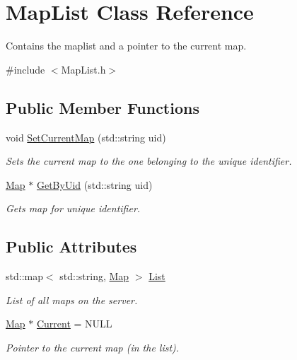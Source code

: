 \hypertarget{classMapList}{\section{Map\-List Class Reference}
\label{classMapList}
}


Contains the maplist and a pointer to the current map.  




{\ttfamily \#include $<$Map\-List.\-h$>$}

\subsection*{Public Member Functions}
\begin{DoxyCompactItemize}
\item 
void \hyperlink{classMapList_a8202d99b60adc444fb42f0ce2d2b3dbd}{Set\-Current\-Map} (std\-::string uid)
\begin{DoxyCompactList}\small\item\em Sets the current map to the one belonging to the unique identifier. \end{DoxyCompactList}\item 
\hyperlink{structMap}{Map} $\ast$ \hyperlink{classMapList_ada7a7c8b0a9b7e1ba41d0678b86d4b61}{Get\-By\-Uid} (std\-::string uid)
\begin{DoxyCompactList}\small\item\em Gets map for unique identifier. \end{DoxyCompactList}\end{DoxyCompactItemize}
\subsection*{Public Attributes}
\begin{DoxyCompactItemize}
\item 
\hypertarget{classMapList_a02d028e30cdaf96170b885237b34990c}{std\-::map$<$ std\-::string, \hyperlink{structMap}{Map} $>$ \hyperlink{classMapList_a02d028e30cdaf96170b885237b34990c}{List}}\label{classMapList_a02d028e30cdaf96170b885237b34990c}

\begin{DoxyCompactList}\small\item\em List of all maps on the server. \end{DoxyCompactList}\item 
\hypertarget{classMapList_a9ff0021f3b08091091e58d3109c41400}{\hyperlink{structMap}{Map} $\ast$ \hyperlink{classMapList_a9ff0021f3b08091091e58d3109c41400}{Current} = N\-U\-L\-L}\label{classMapList_a9ff0021f3b08091091e58d3109c41400}

\begin{DoxyCompactList}\small\item\em Pointer to the current map (in the list). \end{DoxyCompactList}\end{DoxyCompactItemize}



